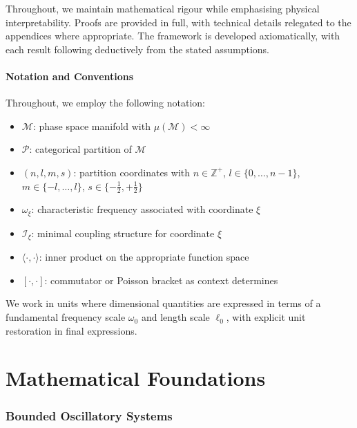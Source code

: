 \documentclass[twocolumn,10pt,a4paper]{article}
\theoremstyle{remark}
\newcommand{\manifold}{\mathcal{M}}
\newcommand{\partition}{\mathcal{P}}
\newcommand{\instrument}{\mathcal{I}}
\newcommand{\Integers}{\mathbb{Z}}
\begin{document}
Throughout, we maintain mathematical rigour while emphasising physical interpretability. Proofs are provided in full, with technical details relegated to the appendices where appropriate. The framework is developed axiomatically, with each result following deductively from the stated assumptions.

\subsection{Notation and Conventions}

Throughout, we employ the following notation:
\begin{itemize}[noitemsep]
    \item $\manifold$: phase space manifold with $\mu(\manifold) < \infty$
    \item $\partition$: categorical partition of $\manifold$
    \item $(n, l, m, s)$: partition coordinates with $n \in \Integers^+$, $l \in \{0, \ldots, n-1\}$, $m \in \{-l, \ldots, l\}$, $s \in \{-\tfrac{1}{2}, +\tfrac{1}{2}\}$
    \item $\omega_\xi$: characteristic frequency associated with coordinate $\xi$
    \item $\instrument_\xi$: minimal coupling structure for coordinate $\xi$
    \item $\langle \cdot, \cdot \rangle$: inner product on the appropriate function space
    \item $[\cdot, \cdot]$: commutator or Poisson bracket as context determines
\end{itemize}

We work in units where dimensional quantities are expressed in terms of a fundamental frequency scale $\omega_0$ and length scale $\ell_0$, with explicit unit restoration in final expressions.



\part{Mathematical Foundations}
\label{part:foundations}

\section{Bounded Oscillatory Systems}
\label{sec:bounded_oscillatory}
\end{document}
